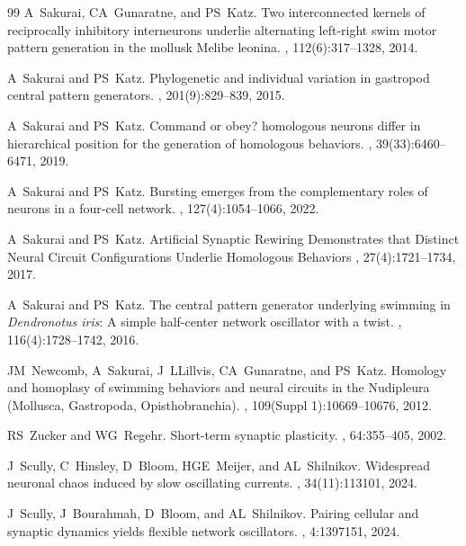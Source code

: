 \documentclass[nofootinbib,aip,amsmath,amssymb,reprint,twocolumn,10pt]{revtex4-2}
\begin{document}
\begin{thebibliography}{99}
A~Sakurai, CA~Gunaratne, and PS~Katz.
\newblock Two interconnected kernels of reciprocally inhibitory interneurons
  underlie alternating left-right swim motor pattern generation in the mollusk
  Melibe leonina.
, 112(6):317--1328, 2014.

A~Sakurai and PS~Katz.
\newblock Phylogenetic and individual variation in gastropod central pattern
  generators.
, 201(9):829--839, 2015.


A~Sakurai and PS~Katz.
\newblock Command or obey? homologous neurons differ in hierarchical position
  for the generation of homologous behaviors.
, 39(33):6460--6471, 2019.

A~Sakurai and PS~Katz.
\newblock Bursting emerges from the complementary roles of neurons in a
  four-cell network.
, 127(4):1054--1066, 2022.

A~Sakurai and PS~Katz.
\newblock Artificial Synaptic Rewiring Demonstrates that Distinct Neural Circuit Configurations
Underlie Homologous Behaviors , 27(4):1721--1734, 2017.


A~Sakurai and PS~Katz.
\newblock  The central pattern generator underlying swimming in \emph{Dendronotus iris}: A simple half-center network oscillator with a twist.
 , 116(4):1728--1742, 2016.


JM~Newcomb, A~Sakurai, J~LLillvis, CA~Gunaratne, and PS~Katz.
\newblock Homology and homoplasy of swimming behaviors and neural circuits in the Nudipleura (Mollusca, Gastropoda, Opisthobranchia).
, 109(Suppl 1):10669--10676, 2012.

RS~Zucker and WG~Regehr.
\newblock Short-term synaptic plasticity.
, 64:355--405, 2002.

J~Scully, C~Hinsley, D~Bloom, HGE~Meijer, and AL~Shilnikov.
\newblock Widespread neuronal chaos induced by slow oscillating currents.
, 34(11):113101, 2024.

J~Scully, J~Bourahmah, D~Bloom, and AL~Shilnikov.
\newblock Pairing cellular and synaptic dynamics yields flexible network oscillators.
, 4:1397151, 2024.


\end{thebibliography}
\end{document}
